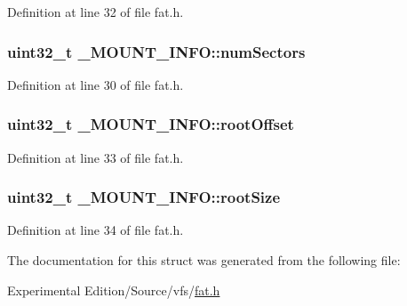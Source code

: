 Definition at line 32 of file fat.\+h.

\subsubsection[{\texorpdfstring{num\+Sectors}{numSectors}}]{\setlength{\rightskip}{0pt plus 5cm}uint32\+\_\+t \+\_\+\+M\+O\+U\+N\+T\+\_\+\+I\+N\+F\+O\+::num\+Sectors}\hypertarget{struct__MOUNT__INFO_a0071bda2d72096f634544df8aacc3f32}{}\label{struct__MOUNT__INFO_a0071bda2d72096f634544df8aacc3f32}


Definition at line 30 of file fat.\+h.

\subsubsection[{\texorpdfstring{root\+Offset}{rootOffset}}]{\setlength{\rightskip}{0pt plus 5cm}uint32\+\_\+t \+\_\+\+M\+O\+U\+N\+T\+\_\+\+I\+N\+F\+O\+::root\+Offset}\hypertarget{struct__MOUNT__INFO_aeccc0a73a2a1f4d2a55cd938461bcd45}{}\label{struct__MOUNT__INFO_aeccc0a73a2a1f4d2a55cd938461bcd45}


Definition at line 33 of file fat.\+h.

\subsubsection[{\texorpdfstring{root\+Size}{rootSize}}]{\setlength{\rightskip}{0pt plus 5cm}uint32\+\_\+t \+\_\+\+M\+O\+U\+N\+T\+\_\+\+I\+N\+F\+O\+::root\+Size}\hypertarget{struct__MOUNT__INFO_afe78a775d2d21ba728ffb7df951c26a2}{}\label{struct__MOUNT__INFO_afe78a775d2d21ba728ffb7df951c26a2}


Definition at line 34 of file fat.\+h.



The documentation for this struct was generated from the following file\+:\begin{DoxyCompactItemize}
\item 
Experimental Edition/\+Source/vfs/\hyperlink{fat_8h}{fat.\+h}\end{DoxyCompactItemize}

